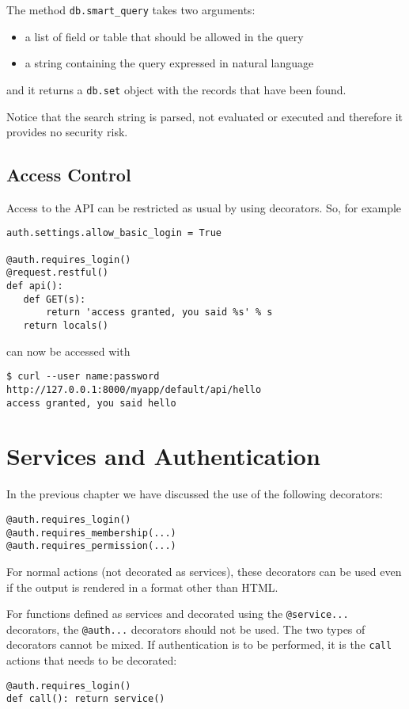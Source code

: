 \documentclass[justified,sixbynine,notoc]{tufte-book}
\def\ft{\small\tt}
\def\inxx#1{\index{#1}}
\begin{document}
\begin{fullwidth}
The method {\ft db.smart\_query} takes two arguments:
\begin{itemize}
\item a list of field or table that should be allowed in the query

\item a string containing the query expressed in natural language
\end{itemize}
and it returns a {\ft db.set} object with the records that have been found.

Notice that the search string is parsed, not evaluated or executed and therefore it provides no security risk.

\goodbreak\subsection{Access Control}

Access to the API can be restricted as usual by using decorators. So, for example

\begin{lstlisting}
auth.settings.allow_basic_login = True

@auth.requires_login()
@request.restful()
def api():
   def GET(s):
       return 'access granted, you said %s' % s
   return locals()
\end{lstlisting}
\noindent can now be accessed with

\begin{lstlisting}
$ curl --user name:password http://127.0.0.1:8000/myapp/default/api/hello
access granted, you said hello
\end{lstlisting}

\goodbreak\section{Services and Authentication}

\inxx{Authentication}

In the previous chapter we have discussed the use of the following decorators:
\begin{lstlisting}
@auth.requires_login()
@auth.requires_membership(...)
@auth.requires_permission(...)
\end{lstlisting}

For normal actions (not decorated as services), these decorators can be used even if the output is rendered in a format other than HTML.

For functions defined as services and decorated using the {\ft @service...} decorators, the {\ft @auth...} decorators should not be used. The two types of decorators cannot be mixed. If authentication is to be performed, it is the {\ft call} actions that needs to be decorated:
\begin{lstlisting}
@auth.requires_login()
def call(): return service()
\end{lstlisting}


\end{fullwidth}
\end{document}
